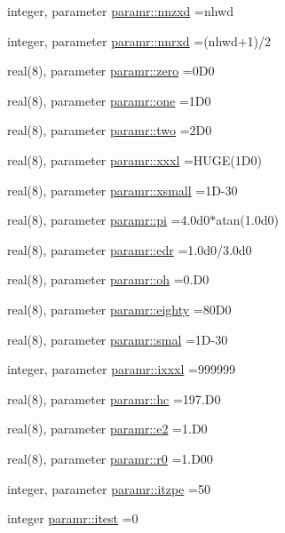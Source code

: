 \begin{DoxyCompactItemize}
\item 
integer, parameter \hyperlink{namespaceparamr_a2d912f07f6699ff298fd9887808a79fb}{paramr\+::nnzxd} =nhwd
\item 
integer, parameter \hyperlink{namespaceparamr_aae1715448aba3fff0e2cdf279c593f2b}{paramr\+::nnrxd} =(nhwd+1)/2
\item 
real(8), parameter \hyperlink{namespaceparamr_afe699408c9872c88006dfddc7e87e2da}{paramr\+::zero} =0\+D0
\item 
real(8), parameter \hyperlink{namespaceparamr_a3038617abc42e475c822dcf484e2082e}{paramr\+::one} =1\+D0
\item 
real(8), parameter \hyperlink{namespaceparamr_a58c4634badf6036e07adcbc71f2d3461}{paramr\+::two} =2\+D0
\item 
real(8), parameter \hyperlink{namespaceparamr_a6bf23a9b98d0c83e261277cb9bb303fb}{paramr\+::xxxl} =H\+U\+GE(1\+D0)
\item 
real(8), parameter \hyperlink{namespaceparamr_a876da96687a8b24b0621640d862bea99}{paramr\+::xsmall} =1\+D-\/30
\item 
real(8), parameter \hyperlink{namespaceparamr_a7e2dc20cc92d78c7f3473ce67b11d0f0}{paramr\+::pi} =4.\+0d0$\ast$atan(1.\+0d0)
\item 
real(8), parameter \hyperlink{namespaceparamr_ae6e80d7b541f9af7e87132564f1795c8}{paramr\+::edr} =1.\+0d0/3.\+0d0
\item 
real(8), parameter \hyperlink{namespaceparamr_aac25693e19c755d7f856ed0784043f4e}{paramr\+::oh} =0.\+D0
\item 
real(8), parameter \hyperlink{namespaceparamr_a193383fee42912673814402013918bb2}{paramr\+::eighty} =80\+D0
\item 
real(8), parameter \hyperlink{namespaceparamr_a4011c8cb7093e8daade112c2cc14f536}{paramr\+::smal} =1\+D-\/30
\item 
integer, parameter \hyperlink{namespaceparamr_a96850280b19dff419aec41c471f259fd}{paramr\+::ixxxl} =999999
\item 
real(8), parameter \hyperlink{namespaceparamr_ae307a42af690e6ee9306fffb321fac5f}{paramr\+::hc} =197.\+D0
\item 
real(8), parameter \hyperlink{namespaceparamr_a305f3e9e10b7124881dc1c614e2a46ad}{paramr\+::e2} =1.\+D0
\item 
real(8), parameter \hyperlink{namespaceparamr_a063c9af80ff448638de55fbf7a5a81b9}{paramr\+::r0} =1.\+D00
\item 
integer, parameter \hyperlink{namespaceparamr_a3793810490c9a71b1290280848f952ab}{paramr\+::itzpe} =50
\item 
integer \hyperlink{namespaceparamr_a52ac61adb92cf4788f93f3284fc94eea}{paramr\+::itest} =0
\end{DoxyCompactItemize}
